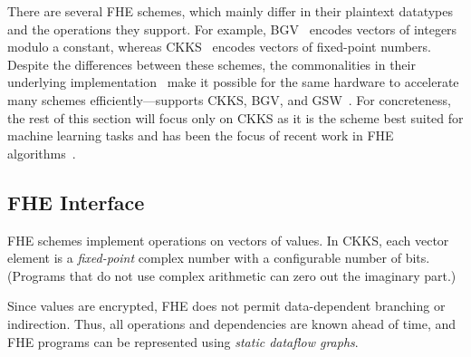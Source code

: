 There are several FHE schemes, which mainly differ in their plaintext datatypes and the operations they support.
For example, BGV~\cite{brakerski:toct14:leveled} encodes vectors of integers modulo a constant,
whereas CKKS~\cite{cheon:ictaci17:homomorphic} encodes vectors of fixed-point numbers.
Despite the differences between these schemes, %
the commonalities in their underlying implementation~\cite{lyubashevsky:tact10:ideal}
make it possible for the same hardware to
accelerate many schemes
efficiently---\name supports CKKS, BGV, and GSW~\cite{gentry:crypto13:homomorphic}.
For concreteness, the rest of this section will focus only on CKKS as it
is the scheme best suited for machine learning tasks and has been the focus of
recent work in FHE algorithms~\cite{han:iacr18:efficient,lee:2021:privacy,gilad:icml16:cryptonets,podschwadt:2020:classification,dathathri:pldi19:chet,dathathri:pldi20:eva}.

\subsection{FHE Interface}

FHE schemes implement operations on vectors of values.
In CKKS, each vector element is a \emph{fixed-point} complex number with a configurable number of bits.
(Programs that do not use complex arithmetic can zero out the imaginary part.)

Since values are encrypted, FHE does not permit data-dependent branching or indirection.
Thus, all operations and dependencies are known ahead of time, and FHE programs can
be represented using \emph{static dataflow graphs}.

